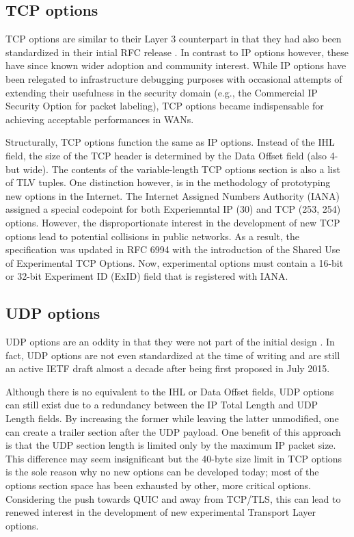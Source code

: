 \subsection{TCP options}

TCP options are similar to their Layer 3 counterpart in that they had also been
standardized in their intial RFC release \cite{rfc793}. In contrast to IP options
however, these have since known wider adoption and community interest. While IP
options have been relegated to infrastructure debugging purposes with occasional
attempts of extending their usefulness in the security domain (e.g., the
Commercial IP Security Option for packet labeling), TCP options became
indispensable for achieving acceptable performances in WANs.

Structurally, TCP options function the same as IP options. Instead of the IHL
field, the size of the TCP header is determined by the Data Offset field (also
4-but wide). The contents of the variable-length TCP options section is also a
list of TLV tuples. One distinction however, is in the methodology of
prototyping new options in the Internet. The Internet Assigned Numbers Authority
(IANA) assigned a special codepoint for both Experiemntal IP (30) and TCP (253,
254) options. However, the disproportionate interest in the development of new
TCP options lead to potential collisions in public networks. As a result, the
specification was updated in RFC 6994 with the introduction of the Shared Use of
Experimental TCP Options. Now, experimental options must contain a 16-bit or
32-bit Experiment ID (ExID) field that is registered with IANA.

\subsection{UDP options}

UDP options are an oddity in that they were not part of the initial design
\cite{postel1980rfc0768}. In fact, UDP options are not even standardized at the
time of writing and are still an active IETF draft almost a decade after being
first proposed in July 2015.

Although there is no equivalent to the IHL or Data Offset fields, UDP options
can still exist due to a redundancy between the IP Total Length and UDP Length
fields. By increasing the former while leaving the latter unmodified, one can
create a trailer section after the UDP payload. One benefit of this approach is
that the UDP section length is limited only by the maximum IP packet size. This
difference may seem insignificant but the 40-byte size limit in TCP options is
the sole reason why no new options can be developed today; most of the options
section space has been exhausted by other, more critical options. Considering
the push towards QUIC \cite{langley2017quic} and away from TCP/TLS, this can
lead to renewed interest in the development of new experimental Transport Layer
options.

